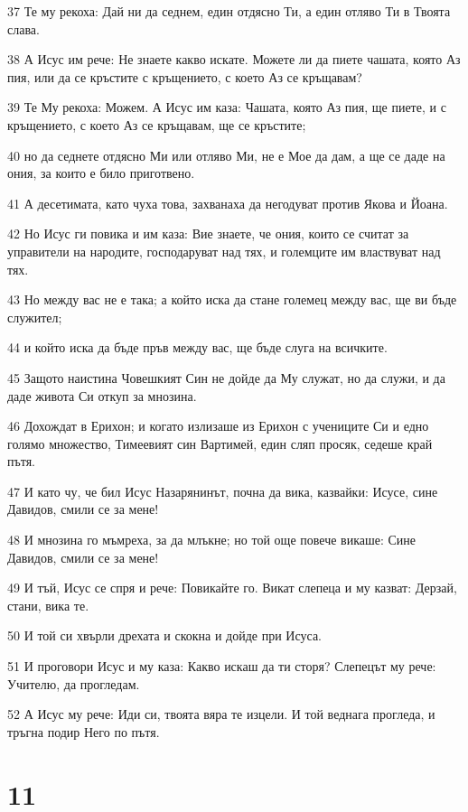 \par 37 Те му рекоха: Дай ни да седнем, един отдясно Ти, а един отляво Ти в Твоята слава.
\par 38 А Исус им рече: Не знаете какво искате. Можете ли да пиете чашата, която Аз пия, или да се кръстите с кръщението, с което Аз се кръщавам?
\par 39 Те Му рекоха: Можем. А Исус им каза: Чашата, която Аз пия, ще пиете, и с кръщението, с което Аз се кръщавам, ще се кръстите;
\par 40 но да седнете отдясно Ми или отляво Ми, не е Мое да дам, а ще се даде на ония, за които е било приготвено.
\par 41 А десетимата, като чуха това, захванаха да негодуват против Якова и Йоана.
\par 42 Но Исус ги повика и им каза: Вие знаете, че ония, които се считат за управители на народите, господаруват над тях, и големците им властвуват над тях.
\par 43 Но между вас не е така; а който иска да стане големец между вас, ще ви бъде служител;
\par 44 и който иска да бъде пръв между вас, ще бъде слуга на всичките.
\par 45 Защото наистина Човешкият Син не дойде да Му служат, но да служи, и да даде живота Си откуп за мнозина.
\par 46 Дохождат в Ерихон; и когато излизаше из Ерихон с учениците Си и едно голямо множество, Тимеевият син Вартимей, един сляп просяк, седеше край пътя.
\par 47 И като чу, че бил Исус Назарянинът, почна да вика, казвайки: Исусе, сине Давидов, смили се за мене!
\par 48 И мнозина го мъмреха, за да млъкне; но той още повече викаше: Сине Давидов, смили се за мене!
\par 49 И тъй, Исус се спря и рече: Повикайте го. Викат слепеца и му казват: Дерзай, стани, вика те.
\par 50 И той си хвърли дрехата и скокна и дойде при Исуса.
\par 51 И проговори Исус и му каза: Какво искаш да ти сторя? Слепецът му рече: Учителю, да прогледам.
\par 52 А Исус му рече: Иди си, твоята вяра те изцели. И той веднага прогледа, и тръгна подир Него по пътя.

\chapter{11}

